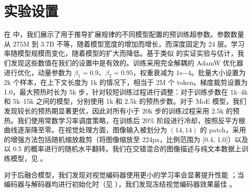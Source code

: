 \section{实验设置}
\label{app:implementation_details}

在  中，我们展示了用于推导扩展规律的不同模型配置的预训练超参数。参数数量从 275M 到 3.7B 不等，随着模型宽度的增加而增长，而深度固定为 24 层。学习率随模型规模而变化，随着模型的扩大而降低。基于类似 \citep{mckinzie2025mm1} 的实证实验与估计，我们发现这些数值在我们的设置中是有效的。训练采用完全解耦的 AdamW 优化器进行优化，动量参数为 $\beta_1=0.9$、$\beta_2=0.95$，权重衰减为 $1\text{e}{-4}$。批量大小设置为 2k 个样本，在上下文长度为 1k 的情况下，相当于 2M 个 token。梯度裁剪设置为 1.0，最大预热时长为 5k 步，针对较短训练过程进行调整：对于训练步数在 1k–4k 和 5k–15k 之间的模型，分别使用 1k 和 2.5k 的预热步数。对于 MoE 模型，我们发现较长的预热期显著更优，因此对所有小于 20k 步的训练过程采用 2.5k 的预热。我们使用常数学习率调度策略，在训练后 20\% 阶段进行冷却，按照反平方根曲线逐渐降至零。在视觉处理方面，图像输入被划分为 $(14,14)$ 的 patch，采用的增强方法包括随机缩放裁剪（将图像缩放至 224px，比例范围为 [0.4, 1.0]）以及以 0.5 的概率进行的随机水平翻转。我们在交错混合的图像描述与纯文本数据上训练模型，见 。

对于后融合模型，我们发现对视觉编码器使用更小的学习率会显著提升性能 ；当编码器与解码器均进行初始化时（见 ），我们发现冻结视觉编码器效果最佳 。

